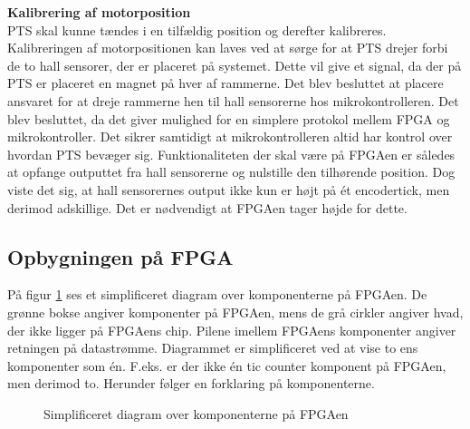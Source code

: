 \textbf{Kalibrering af motorposition}\\
PTS skal kunne tændes i en tilfældig position og derefter kalibreres.
Kalibreringen af motorpositionen kan laves ved at sørge for at PTS drejer forbi 
de to hall sensorer, der er placeret på systemet. Dette vil give et signal, da 
der på PTS er placeret en magnet på hver af rammerne.
Det blev besluttet at placere ansvaret for at dreje rammerne hen til hall 
sensorerne hos mikrokontrolleren. Det blev besluttet, da det giver mulighed for 
en simplere protokol mellem FPGA og mikrokontroller. Det sikrer samtidigt at mikrokontrolleren 
altid har kontrol over hvordan PTS bevæger sig.
Funktionaliteten der skal være på FPGAen er således at opfange outputtet fra 
hall sensorerne og nulstille den tilhørende position.
Dog viste det sig, at hall sensorernes output ikke kun er højt på ét encodertick, 
men derimod adskillige. Det er nødvendigt at FPGAen tager højde for 
dette.

\subsection{Opbygningen på FPGA}
På figur \ref{fig:FPGA_blok} ses et simplificeret diagram over komponenterne på FPGAen. 
De grønne bokse angiver komponenter på FPGAen, mens de grå cirkler angiver hvad, der ikke ligger på 
FPGAens chip. Pilene imellem FPGAens komponenter angiver retningen på 
datastrømme. Diagrammet er simplificeret ved at vise to ens komponenter som én. 
F.eks. er der ikke én tic counter komponent på FPGAen, men derimod to.
Herunder følger en forklaring på komponenterne.

\begin{figure}[!th]
\centering
\begin{tikzpicture}[node distance = 5 cm,scale=1]

\end{tikzpicture}
\caption[Diagram over FPGA komponenter]{Simplificeret diagram over komponenterne på FPGAen}
\label{fig:FPGA_blok}
\end{figure}


